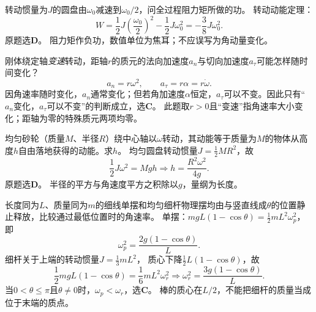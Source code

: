 \problemtext 转动惯量为$J$的圆盘由$\omega_0$减速到$\omega_0/2$，问全过程阻力矩所做的功。
\workings
转动动能定理：
\[
W=\frac12J\left(\frac{\omega_0}{2}\right)^2-\frac12J\omega_0^2
=\boxed{-\frac38J\omega_0^2}.
\]
原题选\textbf{D}。
\crosscheck 阻力矩作负功，数值单位为焦耳；不应误写为角动量变化。

\problemtext 刚体绕定轴\emph{变速}转动，距轴$r$的质元的法向加速度$a_n$与切向加速度$a_\tau$可能怎样随时间变化？
\workings
\[
a_n=r\omega^2,\qquad a_\tau=r\alpha=r\dot\omega.
\]
因角速率随时变化，$a_n$通常变化；但若角加速度$\alpha$恒定，$a_\tau$可以不变。因此只有“$a_n$变化，$a_\tau$可以不变”的判断成立，选\textbf{C}。
\crosscheck 此题取$r>0$且“变速”指角速率大小变化；距轴为零的特殊质元两项均零。

\problemtext 均匀砂轮（质量$M$、半径$R$）绕中心轴以$\omega$转动，其动能等于质量为$M$的物体从高度$h$自由落地获得的动能。求$h$。
\workings
均匀圆盘转动惯量$J=\frac12MR^2$，故
\[
\frac12J\omega^2=Mgh
\Longrightarrow \boxed{h=\frac{R^2\omega^2}{4g}}.
\]
原题选\textbf{D}。
\crosscheck 半径的平方与角速度平方之积除以$g$，量纲为长度。

\problemtext 长度同为$L$、质量同为$m$的细线单摆和均匀细杆物理摆均由与竖直线成$\theta$的位置静止释放，比较通过最低位置时的角速率。
\workings
单摆：$mgL(1-\cos\theta)=\frac12mL^2\omega_p^2$，即
\[
\omega_p^2=\frac{2g(1-\cos\theta)}{L}.
\]
细杆关于上端的转动惯量$J=\frac13mL^2$，
质心下降$\frac12L(1-\cos\theta)$，故
\[
\frac12mgL(1-\cos\theta)=\frac16mL^2\omega_r^2
\Longrightarrow \omega_r^2=\frac{3g(1-\cos\theta)}{L}.
\]
当$0<\theta\le\pi$且$\theta\ne0$时，$\omega_p<\omega_r$，选\textbf{C}。
\crosscheck 棒的质心在$L/2$，不能把细杆的质量当成位于末端的质点。
